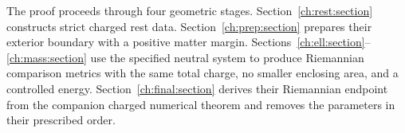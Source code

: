The proof proceeds through four geometric stages. Section~\ref{ch:rest:section} constructs strict charged rest data. Section~\ref{ch:prep:section} prepares their exterior boundary with a positive matter margin. Sections~\ref{ch:ell:section}--\ref{ch:mass:section} use the specified neutral system to produce Riemannian comparison metrics with the same total charge, no smaller enclosing area, and a controlled energy. Section~\ref{ch:final:section} derives their Riemannian endpoint from the companion charged numerical theorem and removes the parameters in their prescribed order.
